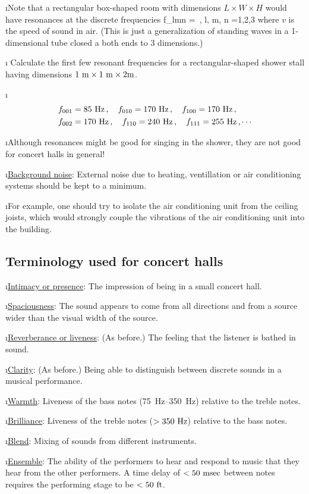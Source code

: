 \i Note that a rectangular box-shaped room with 
dimensions $L\times W\times H$
would have resonances at the discrete frequencies
%
\be
f_{lmn} = 
\,,
\qquad
l, m, n =1,2,3\cdots
\ee
%
where $v$ is the speed of sound in air.
(This is just a generalization of standing waves in 
a 1-dimensional tube closed a both ends to 3 dimensions.)

\i \exer
Calculate the first few resonant frequencies for a 
rectangular-shaped shower stall having dimensions 
$1~{\rm m}\times 1~{\rm m}\times 2{\rm m}$.

\i \ans
%
\begin{align}
&f_{001}=85~{\rm Hz}\,,\quad
f_{010}=170~{\rm Hz}\,,\quad
f_{100}=170~{\rm Hz}\,,\quad
\\
&f_{002}=170~{\rm Hz}\,,\quad
f_{110}=240~{\rm Hz}\,,\quad
f_{111}=255~{\rm Hz}\,,\cdots
\end{align}

\i Although resonances might be good for singing in the 
shower, they are not good for concert halls in general!

\i \underline{Background noise}:
External noise due to heating, ventillation or air conditioning
systems should be kept to a minimum.

\i For example, one should try to isolate the air conditioning 
unit from the ceiling joists, which would strongly couple the 
vibrations of the air conditioning unit into the building.
 
\ei
\subsection{Terminology used for concert halls}
\bi

\i \underline{Intimacy or presence}:
The impression of being in a small concert hall.

\i \underline{Spaciousness}:
The sound appears to come from all directions and
from a source wider than the visual width of the source.

\i \underline{Reverberance or liveness}:
(As before.)
The feeling that the listener is bathed in sound.

\i \underline{Clarity}:
(As before.)
Being able to distinguish between discrete sounds in a musical
performance.

\i \underline{Warmth}:
Liveness of the bass notes (75~Hz--350~Hz) relative to the
treble notes.

\i \underline{Brilliance}:
Liveness of the treble notes ($>350~{\rm Hz}$) relative to the
bass notes.

\i \underline{Blend}:
Mixing of sounds from different instruments.

\i \underline{Ensemble}:
The ability of the performers to hear and respond to music
that they hear from the other performers.
A time delay of $< 50~{\rm msec}$ between notes 
requires the performing stage to be $< 50~{\rm ft}$.

\ei

